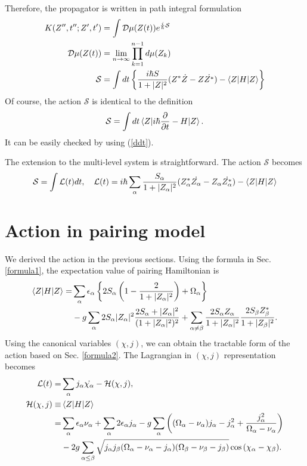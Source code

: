 \documentclass[11pt]{book} %
\begin{document}
Therefore, the propagator is written in path integral formulation
\begin{align}
    K(Z'',t'';Z',t') &= \int \mathcal{D}\mu(Z(t))e^{\frac{i}{\hbar}\mathcal{S}} \\
     \mathcal{D}\mu(Z(t)) &= \lim_{n \to \infty} \prod_{k=1}^{n-1}d\mu(Z_k) \\
    \mathcal{S} &= \int dt \left\{ \frac{i\hbar S}{1+|Z|^2}(Z^*\dot{Z}-Z\dot{Z^*})
    -\braket{Z|H|Z} \right\}
\end{align}
Of course, the action $\mathcal{S}$ is identical to the definition
\begin{align}
  \mathcal{S} = \int dt \braket{Z|i\hbar\frac{\partial}{\partial t}-H|Z} .
\end{align}
It can be easily checked by using (\ref{ddt}).

The extension to the multi-level system is straightforward. The action $\mathcal{S}$ becomes
\begin{equation}
  \mathcal{S} = \int \mathcal{L}(t) dt, \quad 
  \mathcal{L}(t) =i\hbar \sum_{\alpha} \frac{S_{\alpha}}{1+|Z_{\alpha}|^2}
  (Z_{\alpha}^*\dot{Z_{\alpha}}-Z_{\alpha}\dot{Z_{\alpha}^*}) - \braket{Z|H|Z}
\end{equation}

\section{Action in pairing model}
We derived the action in the previous sections. Using the formula in Sec. \ref{formula1}, the expectation value of pairing Hamiltonian is
\begin{align}
  \braket{Z|H|Z} =& \sum_{\alpha} \epsilon_{\alpha} \left\{ 2S_{\alpha}\left( 1-\frac{2}{1+|Z_{\alpha}|^2} \right) + \Omega_{\alpha} \right\} \nonumber \\
   &- g\sum_{\alpha} 2S_{\alpha}|Z_{\alpha}|^2\frac{2S_{\alpha}+|Z_{\alpha}|^2}{(1+|Z_{\alpha}|^2)^2}
    + \sum_{\alpha \neq \beta} \frac{2S_{\alpha}Z_{\alpha}}{1+|Z_{\alpha}|^2}\frac{2S_{\beta}Z_{\beta}^*}{1+|Z_{\beta}|^2} .
\end{align}
Using the canonical variables $(\chi,j)$, we can obtain the tractable form of the action based on Sec. \ref{formula2}. 
The Lagrangian in $(\chi,j)$ representation becomes
\begin{align}
	\mathcal{L}(t) =& \sum_{\alpha} j_{\alpha}\dot{\chi_{\alpha}} - \mathcal{H}(\chi,j) ,\\
	\mathcal{H}(\chi,j) \equiv& \braket{Z|H|Z} \nonumber \\
	=& \sum_{\alpha} \epsilon_{\alpha}\nu_{\alpha} + \sum_{\alpha} 2\epsilon_{\alpha}j_{\alpha} - g\sum_{\alpha} \left( (\Omega_{\alpha}-\nu_{\alpha}) j_{\alpha} - j_{\alpha}^2 +\frac{j_{\alpha}^2}{\Omega_{\alpha}-\nu_{\alpha}} \right) \nonumber \\
	&- 2g\sum_{\alpha\le \beta} \sqrt{j_{\alpha}j_{\beta}(\Omega_{\alpha}-\nu_{\alpha}-j_{\alpha})(\Omega_{\beta}-\nu_{\beta}-j_{\beta})}\cos{(\chi_{\alpha}-\chi_{\beta})}   .
\end{align}
\end{document}
